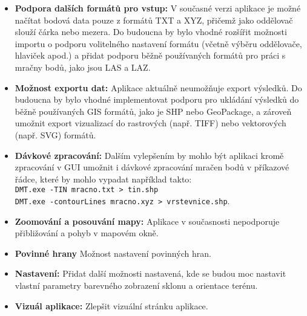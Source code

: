 \begin{itemize} 
    \item \textbf{Podpora dalších formátů pro vstup:} V současné verzi aplikace je možné načítat bodová data pouze z formátů TXT a XYZ, přičemž jako oddělovač slouží čárka nebo mezera. Do budoucna by bylo vhodné rozšířit možnosti importu o podporu volitelného nastavení formátu (včetně výběru oddělovače, hlaviček apod.) a přidat podporu běžně používaných formátů pro práci s mračny bodů, jako jsou LAS a LAZ.
    
    \item \textbf{Možnost exportu dat:} Aplikace aktuálně neumožňuje export výsledků. Do budoucna by bylo vhodné implementovat podporu pro ukládání výsledků do běžně používaných GIS formátů, jako je SHP nebo GeoPackage, a zároveň umožnit export vizualizací do rastrových (např. TIFF) nebo vektorových (např. SVG) formátů.
    
    \item \textbf{Dávkové zpracování:} Dalším vylepšením by mohlo být aplikaci kromě zpracování v GUI umožnit i dávkové zpracování mračen bodů v příkazové řádce, které by mohlo vypadat například takto:\\ \texttt{DMT.exe -TIN mracno.txt > tin.shp}\\ \texttt{DMT.exe -contourLines mracno.xyz > vrstevnice.shp}.
    
    \item \textbf{Zoomování a posouvání mapy:} Aplikace v současnosti nepodporuje přibližování a pohyb v mapovém okně.

    \item \textbf{Povinné hrany} Možnost nastavení povinných hran.

    \item \textbf{Nastavení:} Přidat další možnosti nastavená, kde se budou moc nastavit vlastní parametry barevného zobrazení sklonu a orientace terénu.

    \item \textbf{Vizuál aplikace:} Zlepšit vizuální stránku aplikace.

\end{itemize}

